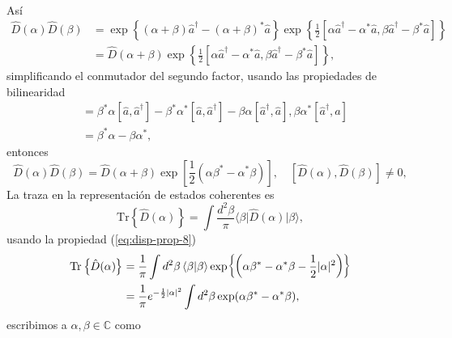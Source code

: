 \begin{enumerate}
\begin{align}
        \end{align}
        Así
        \begin{align}
          \hat{D}(\alpha)\hat{D}(\beta) & = \exp{\left\{ (\alpha+\beta)\hat{a}^{\dagger} - (\alpha+\beta)^{*}\hat{a} \right\}}\exp{\left\{ \frac{1}{2}[\alpha\hat{a}^{\dagger} -\alpha^{*}\hat{a},\beta\hat{a}^{\dagger} - \beta^{*}\hat{a}] \right\}} \\
                                        & = \hat{D}(\alpha + \beta)\exp{\left\{ \frac{1}{2}[\alpha\hat{a}^{\dagger} -\alpha^{*}\hat{a},\beta\hat{a}^{\dagger} - \beta^{*}\hat{a}] \right\}},
        \end{align}
        simplificando el conmutador del segundo factor, usando las propiedades de bilinearidad
        \begin{align}
          [\alpha\hat{a}^{\dagger} -\alpha^{*}\hat{a},\beta\hat{a}^{\dagger} - \beta^{*}\hat{a}] & = \beta^{*}\alpha[\hat{a}, \hat{a}^{\dagger}] - \beta^{*}\alpha^{*}[\hat{a}, \hat{a}^{\dagger}] - \beta\alpha[\hat{a}^{\dagger}, \hat{a}], \beta\alpha^*[\hat{a}^{\dagger},\hat{a}] \\
                                                                                                 & =\beta^{*}\alpha - \beta\alpha^{*},
        \end{align}
        entonces
        \begin{equation}
          \hat{D}(\alpha)\hat{D}(\beta) = \hat{D}(\alpha + \beta) \exp{\left[ \frac{1}{2}(\alpha\beta^* - \alpha^*\beta) \right]}, \quad [\hat{D}(\alpha), \hat{D}(\beta)]\neq 0,
        \end{equation}
        La traza en la representación de estados coherentes es
        \begin{equation}
          \mathrm{Tr}\left\{\hat{D}(\alpha) \right\} = \int \frac{d^2\beta}{\pi}\langle \beta \vert \hat{D}(\alpha) \vert \beta \rangle,
        \end{equation}
        usando la propiedad (\ref{eq:disp-prop-8})
        \begin{align}
          \mathrm{Tr}\left\{ \hat{D}(\alpha) \right\} & = \frac{1}{\pi}\int d^2\beta \braket{\beta}{\beta}\exp{\left( \alpha\beta^* - \alpha^*\beta - \frac{1}{2}|\alpha|^2 \right)} \\
                                                      & = \frac{1}{\pi}e^{-\frac{1}{2}|\alpha|^2} \int d^2\beta \exp(\alpha\beta^* - \alpha^*\beta),
        \end{align}
        escribimos a $\alpha,\beta \in \mathbb{C} $ como

\end{enumerate}
